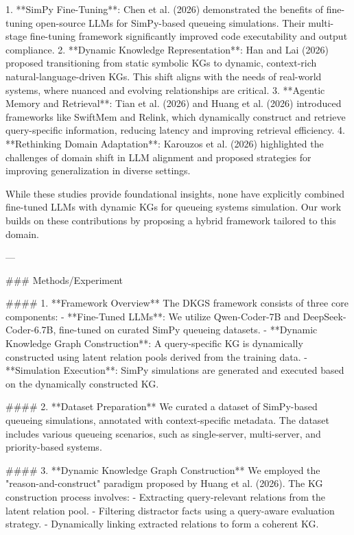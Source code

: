1. **SimPy Fine-Tuning**: Chen et al. (2026) demonstrated the benefits of fine-tuning open-source LLMs for SimPy-based queueing simulations. Their multi-stage fine-tuning framework significantly improved code executability and output compliance.  
2. **Dynamic Knowledge Representation**: Han and Lai (2026) proposed transitioning from static symbolic KGs to dynamic, context-rich natural-language-driven KGs. This shift aligns with the needs of real-world systems, where nuanced and evolving relationships are critical.  
3. **Agentic Memory and Retrieval**: Tian et al. (2026) and Huang et al. (2026) introduced frameworks like SwiftMem and Relink, which dynamically construct and retrieve query-specific information, reducing latency and improving retrieval efficiency.  
4. **Rethinking Domain Adaptation**: Karouzos et al. (2026) highlighted the challenges of domain shift in LLM alignment and proposed strategies for improving generalization in diverse settings.  

While these studies provide foundational insights, none have explicitly combined fine-tuned LLMs with dynamic KGs for queueing systems simulation. Our work builds on these contributions by proposing a hybrid framework tailored to this domain.

---

### Methods/Experiment  

#### 1. **Framework Overview**  
The DKGS framework consists of three core components:  
- **Fine-Tuned LLMs**: We utilize Qwen-Coder-7B and DeepSeek-Coder-6.7B, fine-tuned on curated SimPy queueing datasets.  
- **Dynamic Knowledge Graph Construction**: A query-specific KG is dynamically constructed using latent relation pools derived from the training data.  
- **Simulation Execution**: SimPy simulations are generated and executed based on the dynamically constructed KG.  

#### 2. **Dataset Preparation**  
We curated a dataset of SimPy-based queueing simulations, annotated with context-specific metadata. The dataset includes various queueing scenarios, such as single-server, multi-server, and priority-based systems.  

#### 3. **Dynamic Knowledge Graph Construction**  
We employed the "reason-and-construct" paradigm proposed by Huang et al. (2026). The KG construction process involves:  
- Extracting query-relevant relations from the latent relation pool.  
- Filtering distractor facts using a query-aware evaluation strategy.  
- Dynamically linking extracted relations to form a coherent KG.  


